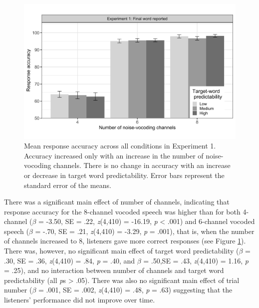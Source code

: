 \documentclass[a4paper, nobind]{templates/ociamthesis}
\begin{document}
\begin{figure}

{\centering \includegraphics[width=0.95\linewidth]{figures/results-fig/expt-1a} 

}

\caption{Mean response accuracy across all conditions in Experiment 1. Accuracy increased only with an increase in the number of noise-vocoding channels. There is no change in accuracy with an increase or decrease in target word predictability. Error bars represent the standard error of the means.}\label{fig:figure1a}
\end{figure}

There was a significant main effect of number of channels, indicating that response accuracy for the 8-channel vocoded speech was higher than for both
4-channel (\(\beta\) = -3.50, SE = .22, \emph{z}(4,410) = -16.19, \emph{p} \textless{} .001)
and 6-channel vocoded speech (\(\beta\) = -.70, SE = .21, \emph{z}(4,410) = -3.29, \emph{p} = .001),
that is, when the number of channels increased to 8, listeners gave more correct responses (see Figure \ref{fig:figure1a}).
There was, however, no significant main effect of target word predictability
(\(\beta\) = .30, SE = .36, \emph{z}(4,410) = .84, \emph{p} = .40, and \(\beta\) = .50,SE = .43, \emph{z}(4,410) = 1.16, \emph{p} = .25),
and no interaction between number of channels and target word predictability (all \emph{p}s \textgreater{} .05).
There was also no significant main effect of trial number
(\(\beta\) = .001, SE = .002, \emph{z}(4,410) = .48, \emph{p} = .63) suggesting that the listeners' performance did not improve over time.
\end{document}
